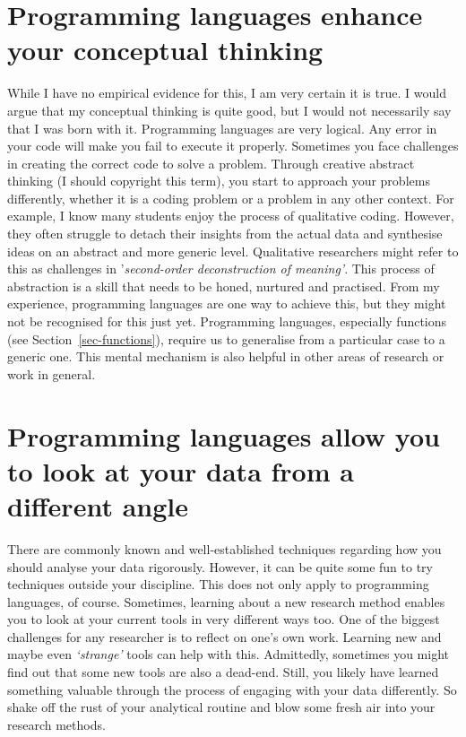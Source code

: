 \documentclass[
  letterpaper,
]{krantz}
\begin{document}
\section{Programming languages enhance your conceptual
thinking}\label{sec-programming-languages-enhance-your-conceptual-thinking}

While I have no empirical evidence for this, I am very certain it is
true. I would argue that my conceptual thinking is quite good, but I
would not necessarily say that I was born with it. Programming languages
are very logical. Any error in your code will make you fail to execute
it properly. Sometimes you face challenges in creating the correct code
to solve a problem. Through creative abstract thinking (I should
copyright this term), you start to approach your problems differently,
whether it is a coding problem or a problem in any other context. For
example, I know many students enjoy the process of qualitative coding.
However, they often struggle to detach their insights from the actual
data and synthesise ideas on an abstract and more generic level.
Qualitative researchers might refer to this as challenges in
'\emph{second-order deconstruction of meaning'}. This process of
abstraction is a skill that needs to be honed, nurtured and practised.
From my experience, programming languages are one way to achieve this,
but they might not be recognised for this just yet. Programming
languages, especially functions (see Section~\ref{sec-functions}),
require us to generalise from a particular case to a generic one. This
mental mechanism is also helpful in other areas of research or work in
general.

\section{Programming languages allow you to look at your data from a
different
angle}\label{sec-programming-languages-allow-you-to-look-at-your-data-from-a-different-angle}

There are commonly known and well-established techniques regarding how
you should analyse your data rigorously. However, it can be quite some
fun to try techniques outside your discipline. This does not only apply
to programming languages, of course. Sometimes, learning about a new
research method enables you to look at your current tools in very
different ways too. One of the biggest challenges for any researcher is
to reflect on one's own work. Learning new and maybe even
\emph{`strange'} tools can help with this. Admittedly, sometimes you
might find out that some new tools are also a dead-end. Still, you
likely have learned something valuable through the process of engaging
with your data differently. So shake off the rust of your analytical
routine and blow some fresh air into your research methods.
\end{document}
